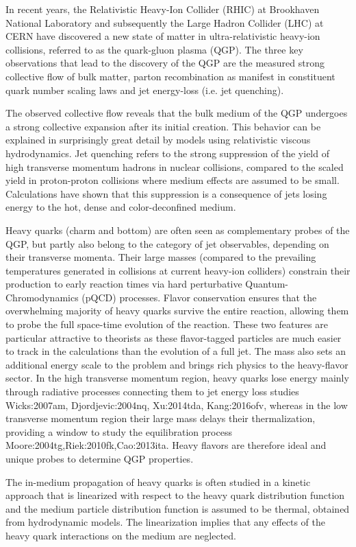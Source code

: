 In recent years, the Relativistic Heavy-Ion Collider (RHIC) at Brookhaven National Laboratory and subsequently the Large Hadron Collider (LHC) at CERN have discovered a new state of matter in ultra-relativistic heavy-ion collisions, referred to as the quark-gluon plasma (QGP).
The three key observations that lead to 
the discovery of the QGP are the measured strong collective flow of bulk matter, parton recombination as manifest in constituent quark number scaling laws and jet energy-loss (i.e. jet quenching). 

The observed collective flow reveals that the bulk medium of the QGP undergoes a strong collective expansion after its initial creation.
This behavior can be explained in surprisingly great detail by models using relativistic viscous hydrodynamics.
Jet quenching refers to the strong suppression of the yield of high transverse momentum hadrons in nuclear collisions, compared to the scaled yield in proton-proton collisions where medium effects are assumed to be small.
Calculations have shown that this suppression is a consequence of jets losing energy to the hot, dense and color-deconfined medium. 

Heavy quarks (charm and bottom) are often seen as complementary probes of the QGP, but partly also belong to the category of jet observables, depending on their transverse momenta. Their large masses (compared to the prevailing temperatures generated in collisions at current heavy-ion colliders) constrain their production to early reaction times via hard perturbative Quantum-Chromodynamics (pQCD) processes. Flavor conservation ensures that the overwhelming majority of heavy quarks survive the entire reaction, allowing them to probe the full space-time evolution of the reaction.
These two features are particular attractive to theorists as these flavor-tagged particles are much easier to track in the calculations than the evolution of a full jet.
The mass also sets an additional energy scale to the problem and brings rich physics to the heavy-flavor sector.
In the high transverse momentum region, heavy quarks lose energy mainly through radiative processes connecting them to jet energy loss studies {Wicks:2007am, Djordjevic:2004nq, Xu:2014tda, Kang:2016ofv}, whereas
in the low transverse momentum region their large mass delays their thermalization, providing a window to study the equilibration process {Moore:2004tg,Riek:2010fk,Cao:2013ita}.
Heavy flavors are therefore ideal and unique probes to determine QGP properties.

The in-medium propagation of heavy quarks is often studied in a kinetic approach that is linearized with respect to the heavy quark distribution function and the medium particle distribution function is assumed to be thermal, obtained from hydrodynamic models.
The linearization implies that any effects of the heavy quark interactions on the medium are neglected.

